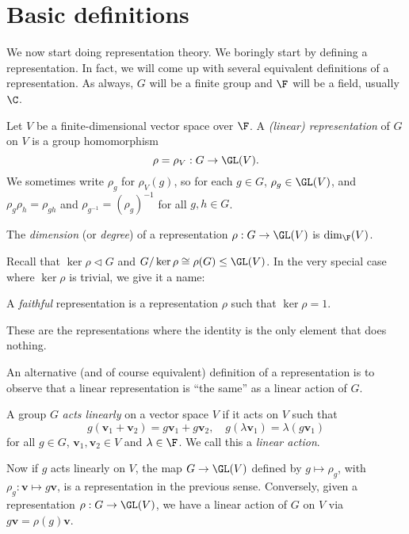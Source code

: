 \documentclass[a4paper]{article}
\begin{document}
\section{Basic definitions}
We now start doing representation theory. We boringly start by defining a representation. In fact, we will come up with several equivalent definitions of a representation. As always, $G$ will be a finite group and $\F$ will be a field, usually $\C$.

\begin{defi}[Representation]
  Let $V$ be a finite-dimensional vector space over $\F$. A \emph{(linear) representation} of $G$ on $V$ is a group homomorphism
  \[
    \rho = \rho_V: G \to \GL(V).
  \]
  We sometimes write $\rho_g$ for $\rho_V(g)$, so for each $g \in G$, $\rho_g \in \GL(V)$, and $\rho_g \rho_h = \rho_{gh}$ and $\rho_{g^{-1}} = (\rho_g)^{-1}$ for all $g, h \in G$.
\end{defi}

\begin{defi}
  The \emph{dimension} (or \emph{degree}) of a representation $\rho: G \to \GL(V)$ is $\dim_\F(V)$.
\end{defi}

Recall that $\ker \rho \lhd G$ and $G/\ker \rho \cong \rho(G) \leq \GL(V)$. In the very special case where $\ker \rho$ is trivial, we give it a name:
\begin{defi}
  A \emph{faithful} representation is a representation $\rho$ such that $\ker \rho = 1$.
\end{defi}
These are the representations where the identity is the only element that does nothing.

An alternative (and of course equivalent) definition of a representation is to observe that a linear representation is ``the same'' as a linear action of $G$.
\begin{defi}
  A group $G$ \emph{acts linearly} on a vector space $V$ if it acts on $V$ such that
  \[
    g(\mathbf{v}_1 + \mathbf{v}_2) = g \mathbf{v}_1 + g \mathbf{v}_2,\quad g(\lambda \mathbf{v}_1) = \lambda (g\mathbf{v}_1)
  \]
  for all $g \in G$, $\mathbf{v}_1, \mathbf{v}_2 \in V$ and $\lambda \in \F$. We call this a \emph{linear action}.
\end{defi}
Now if $g$ acts linearly on $V$, the map $G \to \GL(V)$ defined by $g \mapsto \rho_g$, with $\rho_g: \mathbf{v} \mapsto g\mathbf{v}$, is a representation in the previous sense. Conversely, given a representation $\rho: G \to \GL(V)$, we have a linear action of $G$ on $V$ via $g\mathbf{v} = \rho(g) \mathbf{v}$.
\end{document}
